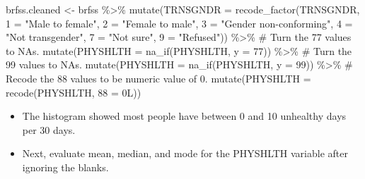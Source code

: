 \documentclass[
  letterpaper,
  DIV=11,
  numbers=noendperiod]{scrreprt}
\newenvironment{Shaded}{\begin{snugshade}}{\end{snugshade}}
\newcommand{\AttributeTok}[1]{\textcolor[rgb]{0.40,0.45,0.13}{#1}}
\newcommand{\CommentTok}[1]{\textcolor[rgb]{0.37,0.37,0.37}{#1}}
\newcommand{\ConstantTok}[1]{\textcolor[rgb]{0.56,0.35,0.01}{#1}}
\newcommand{\DecValTok}[1]{\textcolor[rgb]{0.68,0.00,0.00}{#1}}
\newcommand{\FunctionTok}[1]{\textcolor[rgb]{0.28,0.35,0.67}{#1}}
\newcommand{\NormalTok}[1]{\textcolor[rgb]{0.00,0.23,0.31}{#1}}
\newcommand{\OtherTok}[1]{\textcolor[rgb]{0.00,0.23,0.31}{#1}}
\newcommand{\SpecialCharTok}[1]{\textcolor[rgb]{0.37,0.37,0.37}{#1}}
\newcommand{\StringTok}[1]{\textcolor[rgb]{0.13,0.47,0.30}{#1}}
\begin{document}
\begin{Shaded}
\begin{Highlighting}[]
\NormalTok{brfss.cleaned }\OtherTok{\textless{}{-}}\NormalTok{ brfss }\SpecialCharTok{\%\textgreater{}\%}
    \FunctionTok{mutate}\NormalTok{(}\AttributeTok{TRNSGNDR =} \FunctionTok{recode\_factor}\NormalTok{(TRNSGNDR, }\StringTok{\textasciigrave{}}\AttributeTok{1}\StringTok{\textasciigrave{}} \OtherTok{=} \StringTok{"Male to female"}\NormalTok{, }\StringTok{\textasciigrave{}}\AttributeTok{2}\StringTok{\textasciigrave{}} \OtherTok{=} \StringTok{"Female to male"}\NormalTok{,}
        \StringTok{\textasciigrave{}}\AttributeTok{3}\StringTok{\textasciigrave{}} \OtherTok{=} \StringTok{"Gender non{-}conforming"}\NormalTok{, }\StringTok{\textasciigrave{}}\AttributeTok{4}\StringTok{\textasciigrave{}} \OtherTok{=} \StringTok{"Not transgender"}\NormalTok{, }\StringTok{\textasciigrave{}}\AttributeTok{7}\StringTok{\textasciigrave{}} \OtherTok{=} \StringTok{"Not sure"}\NormalTok{,}
        \StringTok{\textasciigrave{}}\AttributeTok{9}\StringTok{\textasciigrave{}} \OtherTok{=} \StringTok{"Refused"}\NormalTok{)) }\SpecialCharTok{\%\textgreater{}\%}
    \CommentTok{\# Turn the 77 values to NA\textquotesingle{}s.}
\FunctionTok{mutate}\NormalTok{(}\AttributeTok{PHYSHLTH =} \FunctionTok{na\_if}\NormalTok{(PHYSHLTH, }\AttributeTok{y =} \DecValTok{77}\NormalTok{)) }\SpecialCharTok{\%\textgreater{}\%}
    \CommentTok{\# Turn the 99 values to NA\textquotesingle{}s.}
\FunctionTok{mutate}\NormalTok{(}\AttributeTok{PHYSHLTH =} \FunctionTok{na\_if}\NormalTok{(PHYSHLTH, }\AttributeTok{y =} \DecValTok{99}\NormalTok{)) }\SpecialCharTok{\%\textgreater{}\%}
    \CommentTok{\# Recode the 88 values to be numeric value of 0.}
\FunctionTok{mutate}\NormalTok{(}\AttributeTok{PHYSHLTH =} \FunctionTok{recode}\NormalTok{(PHYSHLTH, }\StringTok{\textasciigrave{}}\AttributeTok{88}\StringTok{\textasciigrave{}} \OtherTok{=} \DecValTok{0}\NormalTok{L))}
\end{Highlighting}
\end{Shaded}

\begin{itemize}
\item
  The histogram showed most people have between 0 and 10 unhealthy days
  per 30 days.
\item
  Next, evaluate mean, median, and mode for the PHYSHLTH variable after
  ignoring the blanks.
\end{itemize}

\begin{Shaded}
\end{Shaded}
\end{document}
